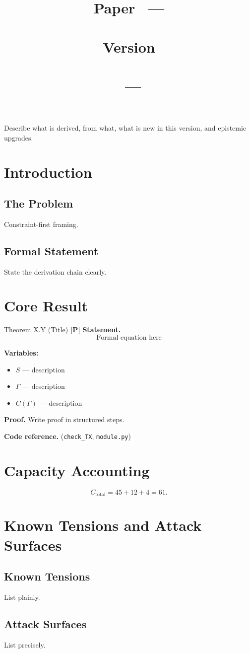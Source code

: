 \documentclass[11pt]{article}
\title{
  \textbf{Paper \PaperNumber\ --- \PaperTitle}\\
  \large \PaperSubtitle\\
  \normalsize Version \PaperVersion\\
  \PaperAuthor\\
  \PaperProject\ --- \PaperDate
}
\author{}
\date{}
\newenvironment{varlist}{\begin{itemize}[leftmargin=*,itemsep=2pt,topsep=2pt]}{\end{itemize}}
\newcommand{\epitag}[1]{\textbf{[#1]}}
\newcommand{\coderef}[2]{(\texttt{#1}, \texttt{#2})}
\newcommand{\Cap}{C}
\begin{document}
\maketitle

\begin{apbox}[Abstract]
Describe what is derived, from what, what is new in this version, and epistemic upgrades.
\end{apbox}

\section{Introduction}

\subsection{The Problem}
Constraint-first framing.

\subsection{Formal Statement}
State the derivation chain clearly.

\section{Core Result}

\begin{apthm}{Theorem X.Y (Title) \epitag{P}}
\textbf{Statement.}
\[
\text{Formal equation here}
\]

\textbf{Variables:}
\begin{varlist}
  \item \(S\) — description
  \item \(\Gamma\) — description
  \item \(\Cap(\Gamma)\) — description
\end{varlist}

\textbf{Proof.}
Write proof in structured steps.

\textbf{Code reference.} \coderef{check_TX}{module.py}
\end{apthm}

\section{Capacity Accounting}

\[
C_{\mathrm{total}} = 45 + 12 + 4 = 61.
\]

\section{Known Tensions and Attack Surfaces}

\subsection{Known Tensions}
List plainly.

\subsection{Attack Surfaces}
List precisely.
\end{document}

